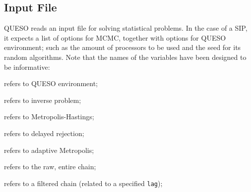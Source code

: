 






 


\subsection{Input File}\label{sec:sip-input-file}


QUESO reads an input file for solving statistical problems. In the case of a SIP, it expects a list of options for MCMC,
together with options for QUESO environment; such as the amount of processors to be used and the seed for its random algorithms.
Note that the names of the variables have been designed to be informative:
\begin{description}\vspace{-8pt}
\item[ \texttt{env}:] refers to QUESO environment; \vspace{-8pt}
\item[ \texttt{ip}:] refers to inverse problem;\vspace{-8pt}
\item[ \texttt{mh}:] refers to Metropolis-Hastings;\vspace{-8pt}
\item[ \texttt{dr}:] refers to delayed rejection;\vspace{-8pt}
\item[ \texttt{am}:] refers to adaptive Metropolis;\vspace{-8pt}
\item[ \texttt{rawChain}:] refers to the raw, entire chain; \vspace{-8pt}
\item[ \texttt{filteredChain}:] refers to a filtered chain (related to a specified \texttt{lag});\vspace{-8pt}
\end{description}


